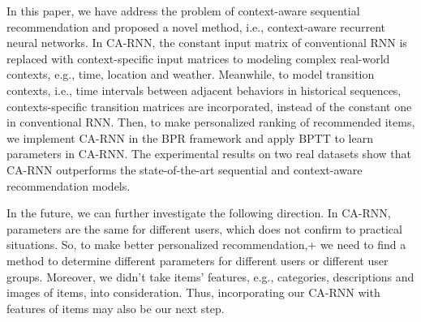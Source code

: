 \documentclass[conference]{IEEEtran}
\begin{document}
In this paper, we have address the problem of context-aware sequential recommendation and proposed a novel method, i.e., context-aware recurrent neural networks. In CA-RNN, the constant input matrix of conventional RNN is replaced with context-specific input matrices to modeling complex real-world contexts, e.g., time, location and weather. Meanwhile, to model transition contexts, i.e., time intervals between adjacent behaviors in historical sequences, contexts-specific transition matrices are incorporated, instead of the constant one in conventional RNN. Then, to make personalized ranking of recommended items, we implement CA-RNN in the BPR framework and apply BPTT to learn parameters in CA-RNN. The experimental results on two real datasets show that CA-RNN outperforms the state-of-the-art sequential and context-aware recommendation models.

In the future, we can further investigate the following direction. In CA-RNN, parameters are the same for different users, which does not confirm to practical situations. So, to make better personalized recommendation,+ we need to find a method to determine different parameters for different users or different user groups. Moreover, we didn't take items' features, e.g., categories, descriptions and images of items, into consideration. Thus, incorporating our CA-RNN with features of items may also be our next step.













%
%
%






\end{document}
